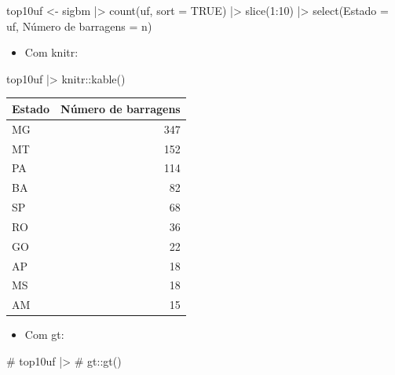 \documentclass[
  letterpaper,
  DIV=11,
  numbers=noendperiod]{scrartcl}
\newenvironment{Shaded}{\begin{snugshade}}{\end{snugshade}}
\newcommand{\AttributeTok}[1]{\textcolor[rgb]{0.40,0.45,0.13}{#1}}
\newcommand{\CommentTok}[1]{\textcolor[rgb]{0.37,0.37,0.37}{#1}}
\newcommand{\ConstantTok}[1]{\textcolor[rgb]{0.56,0.35,0.01}{#1}}
\newcommand{\DecValTok}[1]{\textcolor[rgb]{0.68,0.00,0.00}{#1}}
\newcommand{\FunctionTok}[1]{\textcolor[rgb]{0.28,0.35,0.67}{#1}}
\newcommand{\NormalTok}[1]{\textcolor[rgb]{0.00,0.23,0.31}{#1}}
\newcommand{\OtherTok}[1]{\textcolor[rgb]{0.00,0.23,0.31}{#1}}
\newcommand{\SpecialCharTok}[1]{\textcolor[rgb]{0.37,0.37,0.37}{#1}}
\newcommand{\StringTok}[1]{\textcolor[rgb]{0.13,0.47,0.30}{#1}}
\providecommand{\tightlist}{%
  \setlength{\itemsep}{0pt}\setlength{\parskip}{0pt}}\usepackage{longtable,booktabs,array}
\begin{document}
\begin{Shaded}
\begin{Highlighting}[]
\NormalTok{top10uf }\OtherTok{\textless{}{-}}\NormalTok{ sigbm }\SpecialCharTok{|\textgreater{}}
  \FunctionTok{count}\NormalTok{(uf, }\AttributeTok{sort =} \ConstantTok{TRUE}\NormalTok{) }\SpecialCharTok{|\textgreater{}}
  \FunctionTok{slice}\NormalTok{(}\DecValTok{1}\SpecialCharTok{:}\DecValTok{10}\NormalTok{) }\SpecialCharTok{|\textgreater{}}
  \FunctionTok{select}\NormalTok{(}\StringTok{\textasciigrave{}}\AttributeTok{Estado}\StringTok{\textasciigrave{}} \OtherTok{=}\NormalTok{ uf, }\StringTok{\textasciigrave{}}\AttributeTok{Número de barragens}\StringTok{\textasciigrave{}} \OtherTok{=}\NormalTok{ n)}
\end{Highlighting}
\end{Shaded}

\begin{itemize}
\tightlist
\item
  Com knitr:
\end{itemize}

\begin{Shaded}
\begin{Highlighting}[]
\NormalTok{top10uf }\SpecialCharTok{|\textgreater{}} 
\NormalTok{  knitr}\SpecialCharTok{::}\FunctionTok{kable}\NormalTok{()}
\end{Highlighting}
\end{Shaded}

\begin{longtable}[]{@{}lr@{}}
\toprule()
Estado & Número de barragens \\
\midrule()
\endhead
MG & 347 \\
MT & 152 \\
PA & 114 \\
BA & 82 \\
SP & 68 \\
RO & 36 \\
GO & 22 \\
AP & 18 \\
MS & 18 \\
AM & 15 \\
\bottomrule()
\end{longtable}

\begin{itemize}
\tightlist
\item
  Com gt:
\end{itemize}

\begin{Shaded}
\begin{Highlighting}[]
\CommentTok{\# top10uf |\textgreater{} }
\CommentTok{\#   gt::gt()}
\end{Highlighting}
\end{Shaded}
\end{document}
